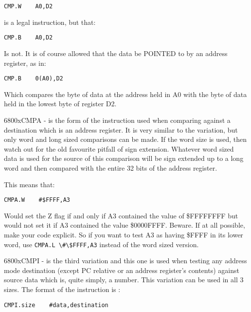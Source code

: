 \begin{lstlisting}[firstnumber=1,]
          CMP.W    A0,D2 
\end{lstlisting}

is a legal instruction, but that:

\begin{lstlisting}[firstnumber=1,]
          CMP.B    A0,D2
\end{lstlisting}

Is not. It is of course allowed that the data be POINTED to by an
    address register, as in:

\begin{lstlisting}[firstnumber=1,]
          CMP.B    0(A0),D2
\end{lstlisting}

Which compares the byte of data at the address held in A0 with the
    byte of data held in the lowest byte of register D2.

\mc6800x{CMPA} -{} is the form of the instruction used when comparing against a
    destination which is an address register. It is very similar to the 
    variation, but only word and long sized comparisons can be made. If the
    word size is used, then watch out for the old favourite pitfall of sign
    extension. Whatever word sized data is used for the source of this
    comparison will be sign extended up to a long word and then compared with
    the entire 32 bits of the address register.

This means that:

\begin{lstlisting}[firstnumber=1,]
          CMPA.W    #$FFFF,A3
\end{lstlisting}

Would set the Z flag if and only if A3 contained the value of
    \$FFFFFFFF but would not set it if A3 contained the value \$0000FFFF.
    Beware. If at all possible, make your code explicit. So if you want to
    test A3 as having \$FFFF in its lower word, use \lstinline{CMPA.L \#\$FFFF,A3} instead of
    the word sized version.

\mc6800x{CMPI} -{} is the third variation and this one is used when testing any
    address mode destination (except PC relative or an address register's
    contents) against source data which is, quite simply, a number. This
    variation can be used in all 3 sizes. The format of the instruction is
   :

\begin{lstlisting}[firstnumber=1,]
          CMPI.size    #data,destination
\end{lstlisting}

